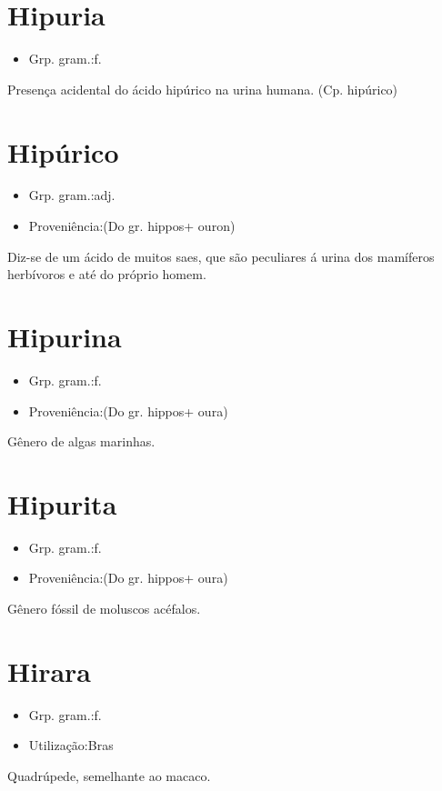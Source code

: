 \documentclass{article}
\begin{document}
\section{Hipuria}
\begin{itemize}
\item {Grp. gram.:f.}
\end{itemize}
Presença acidental do ácido hipúrico na urina humana.
(Cp. \textunderscore hipúrico\textunderscore )
\section{Hipúrico}
\begin{itemize}
\item {Grp. gram.:adj.}
\end{itemize}
\begin{itemize}
\item {Proveniência:(Do gr. \textunderscore hippos\textunderscore  + \textunderscore ouron\textunderscore )}
\end{itemize}
Diz-se de um ácido de muitos saes, que são peculiares á urina dos mamíferos herbívoros e até do próprio homem.
\section{Hipurina}
\begin{itemize}
\item {Grp. gram.:f.}
\end{itemize}
\begin{itemize}
\item {Proveniência:(Do gr. \textunderscore hippos\textunderscore  + \textunderscore oura\textunderscore )}
\end{itemize}
Gênero de algas marinhas.
\section{Hipurita}
\begin{itemize}
\item {Grp. gram.:f.}
\end{itemize}
\begin{itemize}
\item {Proveniência:(Do gr. \textunderscore hippos\textunderscore  + \textunderscore oura\textunderscore )}
\end{itemize}
Gênero fóssil de moluscos acéfalos.
\section{Hirara}
\begin{itemize}
\item {Grp. gram.:f.}
\end{itemize}
\begin{itemize}
\item {Utilização:Bras}
\end{itemize}
Quadrúpede, semelhante ao macaco.
\end{document}
